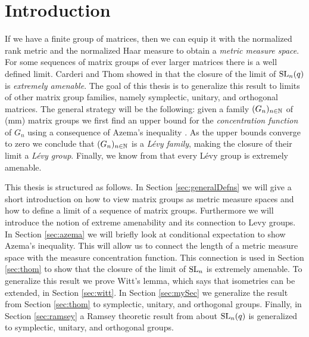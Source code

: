 
\section{Introduction}
If we have a finite group of matrices, then we can equip it with the normalized rank metric and the normalized Haar measure to obtain a \emph{metric measure space}.
For some sequences of matrix groups of ever larger matrices there is a well defined limit.
Carderi and Thom  showed in \cite{thom} that the closure of the limit of $\operatorname{SL}_n(q)$ is \emph{extremely amenable}. The goal of this thesis is to generalize this result to limits of other matrix group families, namely symplectic, unitary, and orthogonal matrices. The general strategy will be the following: given a family $(G_n)_{n\in\mathbb{N}}$ of (mm) matrix groups we first find an upper bound for the \emph{concentration function} of $G_n$ using a consequence of Azema's inequality \cite{Azema}. As the upper bounds converge to zero we conclude that $(G_n)_{n\in\mathbb{N}}$ is a \emph{L\'{e}vy family}, making the closure of their limit a \emph{L\'{e}vy group}. Finally, we know from \cite{Levy} that every L\'{e}vy group is extremely amenable.

This thesis is structured as follows. In Section \ref{sec:generalDefns} we will give a short introduction on how to view matrix groups as metric measure spaces and how to define a limit of a sequence of matrix groups. Furthermore we will introduce the notion of extreme amenability and its connection to Levy groups. In Section \ref{sec:azema} we will briefly look at conditional expectation to show Azema's inequality. This will allow us to connect the length of a metric measure space with the measure concentration function. This connection is used in Section \ref{sec:thom} to show that the closure of the limit of $\operatorname{SL}_n$ is extremely amenable. To generalize this result we prove Witt's lemma, which says that isometries can be extended, in Section \ref{sec:witt}. In Section \ref{sec:mySec} we generalize the result from Section \ref{sec:thom} to symplectic, unitary, and orthogonal groups. Finally, in Section \ref{sec:ramsey} a Ramsey theoretic result from \cite{thom} about $\operatorname{SL}_n(q)$ is generalized to symplectic, unitary, and orthogonal groups.



